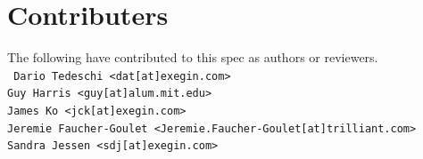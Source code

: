 \documentclass[12pt]{article}
\renewcommand\_{\textunderscore\allowbreak}
\begin{document}
\section{Contributers}\label{sec:references}
The following have contributed to this spec as authors or reviewers.\\
\tt{
Dario Tedeschi <dat[at]exegin.com>\\
Guy Harris <guy[at]alum.mit.edu>\\
James Ko <jck[at]exegin.com>\\
Jeremie Faucher-Goulet <Jeremie.Faucher-Goulet[at]trilliant.com>\\
Sandra Jessen <sdj[at]exegin.com>\\
}
\end{document}
